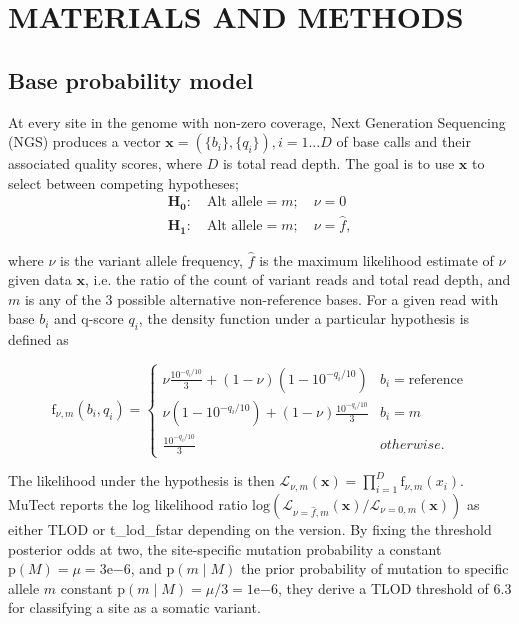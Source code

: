\documentclass[a4,center,fleqn]{NAR}
\begin{document}
\section{MATERIALS AND METHODS}

\subsection{Base probability model}

At every site in the genome with non-zero coverage, Next Generation Sequencing (NGS) produces a vector $\mathbf{x}  = (\{b_i\},\{q_i\}), i = 1\dots D$ of base calls and their associated quality scores, where $D$ is total read depth.
The goal is to use $\mathbf{x}$ to select between competing hypotheses;
\begin{equation*}
\begin{array}{l}
\mathbf{H_0}:\quad \textrm{Alt allele} = m;\quad\nu = 0\\
\mathbf{H_1}:\quad \textrm{Alt allele} = m;\quad\nu = \hat{f},
\end{array}
\end{equation*}

where $\nu$ is the variant allele frequency, $\hat{f}$ is the maximum likelihood estimate of $\nu$ given data $\mathbf{x}$, i.e. the ratio of the count of variant reads and total read depth, and $m$ is any of the 3 possible alternative non-reference bases.
For a given read with base $b_i$ and q-score $q_i$, the density function under a particular hypothesis is defined as

\begin{equation*}
  \textrm{f}_{\nu,m}(b_i,q_i) = \left\{
    \begin{array}{cr}
      \nu \frac{10^{-q_i/10}}{3} + (1-\nu)(1-10^{-q_i/10}) & b_i = \textrm{reference}\\
      \nu(1-10^{-q_i/10}) + (1-\nu) \frac{10^{-q_i/10}}{3} & b_i = m\\
      \frac{10^{-q_i/10}}{3} & otherwise.
    \end{array}
    \right.
\end{equation*}

The likelihood under the hypothesis is then $\mathcal{L}_{\nu,m}(\mathbf{x}) = \prod_{i=1}^{D} \textrm{f}_{\nu,m}(x_i)$.
MuTect reports the log likelihood ratio $\mathrm{log}(\mathcal{L}_{\nu=\hat{f},m}(\mathbf{x})/\mathcal{L}_{\nu=0,m}(\mathbf{x}))$ as either TLOD or \textrm{t\_lod\_fstar} depending on the version.
By fixing the threshold posterior odds at two, the site-specific mutation probability a constant $\mathrm{p}(M)= \mu = 3\mathrm{e}{-6}$, and $\mathrm{p}(m \mid M)$ the prior probability of mutation to specific allele $m$ constant $\mathrm{p}(m \mid M) = \mu/3 = 1\mathrm{e}{-6}$, they derive a TLOD threshold of 6.3 for classifying a site as a somatic variant.
\end{document}
